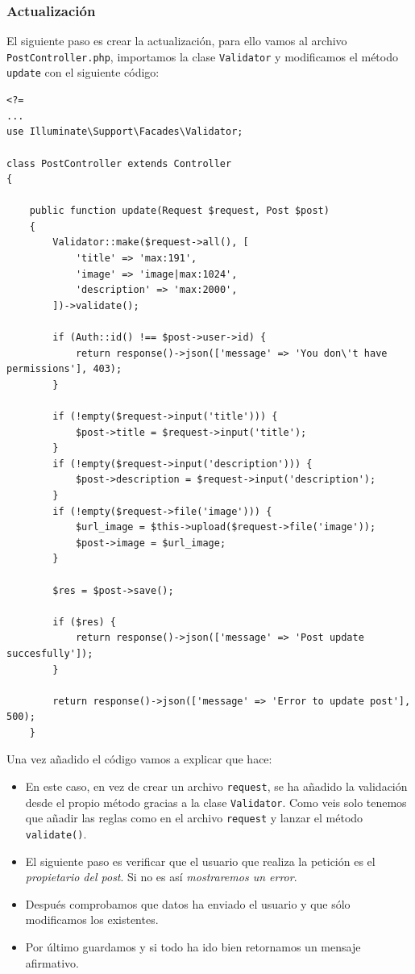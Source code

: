 \documentclass[11pt]{article}
\begin{document}
\subsubsection{Actualización}
\label{sec:orgca34b0a}
El siguiente paso es crear la actualización, para ello vamos al
archivo \texttt{PostController.php}, importamos la clase \texttt{Validator} y
modificamos el método \texttt{update} con el siguiente código:
\begin{verbatim}
<?=
...
use Illuminate\Support\Facades\Validator;

class PostController extends Controller
{

    public function update(Request $request, Post $post)
    {
        Validator::make($request->all(), [
            'title' => 'max:191',
            'image' => 'image|max:1024',
            'description' => 'max:2000',
        ])->validate();

        if (Auth::id() !== $post->user->id) {
            return response()->json(['message' => 'You don\'t have permissions'], 403);
        }

        if (!empty($request->input('title'))) {
            $post->title = $request->input('title');
        }
        if (!empty($request->input('description'))) {
            $post->description = $request->input('description');
        }
        if (!empty($request->file('image'))) {
            $url_image = $this->upload($request->file('image'));
            $post->image = $url_image;
        }

        $res = $post->save();

        if ($res) {
            return response()->json(['message' => 'Post update succesfully']);
        }

        return response()->json(['message' => 'Error to update post'], 500);
    }
\end{verbatim}

Una vez añadido el código vamos a explicar que hace:

\begin{itemize}
\item En este caso, en vez de crear un archivo \texttt{request}, se ha añadido la
validación desde el propio método gracias a la clase \texttt{Validator}. Como
veis solo tenemos que añadir las reglas como en el archivo \texttt{request} y
lanzar el método \texttt{validate()}.
\item El siguiente paso es verificar que el usuario que realiza la
petición es el \emph{propietario del post}. Si no es así \emph{mostraremos un
error}.
\item Después comprobamos que datos ha enviado el usuario y que sólo
modificamos los existentes.
\item Por último guardamos y si todo ha ido bien retornamos un mensaje
afirmativo.
\end{itemize}
\end{document}
